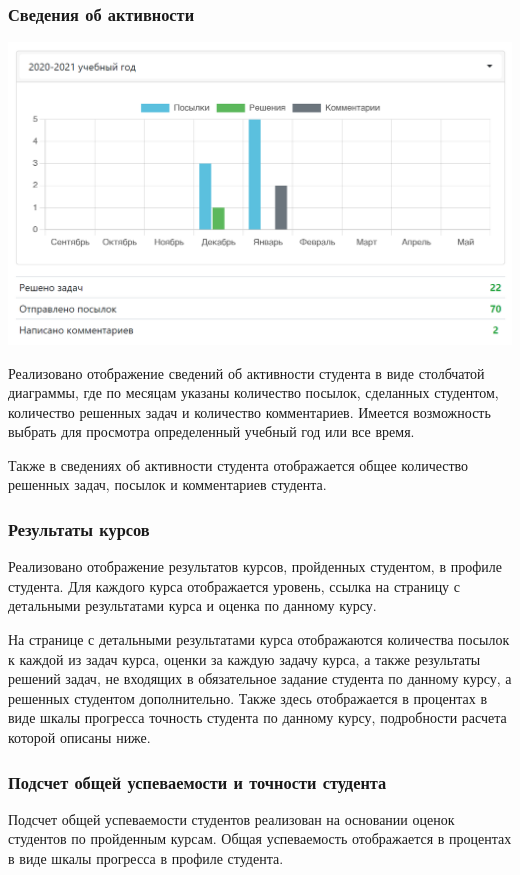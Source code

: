 \documentclass[12pt, a4paper, oneside]{article}
\begin{document}
\subsubsection{Сведения об активности}
\begin{center}
    \includegraphics[scale=0.4]{account-activity}
\end{center}

Реализовано отображение сведений об активности студента в виде столбчатой диаграммы, где по месяцам указаны количество посылок, сделанных студентом, количество решенных задач и количество комментариев. Имеется возможность выбрать для просмотра определенный учебный год или все время.

Также в сведениях об активности студента отображается общее количество решенных задач, посылок и комментариев студента.
\subsubsection{Результаты курсов}
Реализовано отображение результатов курсов, пройденных студентом, в профиле студента. Для каждого курса отображается уровень, ссылка на страницу с детальными результатами курса и оценка по данному курсу.

На странице с детальными результатами курса отображаются количества посылок к каждой из задач курса, оценки за каждую задачу курса, а также результаты решений задач, не входящих в обязательное задание студента по данному курсу, а решенных студентом дополнительно. Также здесь отображается в процентах в виде шкалы прогресса точность студента по данному курсу, подробности расчета которой описаны ниже.
\subsubsection{Подсчет общей успеваемости и точности студента}
Подсчет общей успеваемости студентов реализован на основании оценок студентов по пройденным курсам. Общая успеваемость отображается в процентах в виде шкалы прогресса в профиле студента.
\end{document}
